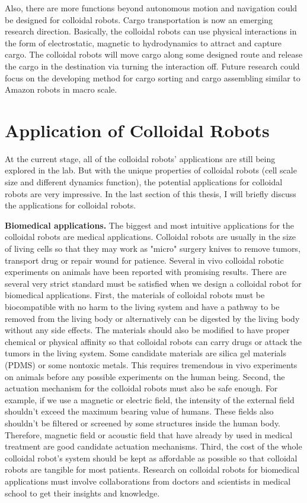 Also, there are more functions beyond autonomous motion and navigation could be designed for colloidal robots. Cargo transportation is now an emerging research direction\autocite{demirors2018active,Martinez-Pedrero2015}. Basically, the colloidal robots can use physical interactions in the form of electrostatic, magnetic to hydrodynamics to attract and capture cargo. The colloidal robots will move cargo along some designed route and release the cargo in the destination via turning the interaction off. Future research could focus  on the developing method for cargo sorting and cargo assembling similar to Amazon robots in macro scale.


\section{Application of Colloidal Robots}
At the current stage, all of the colloidal robots' applications are still being explored in the lab. But with the unique properties of colloidal robots (cell scale size and different dynamics function), the potential applications for colloidal robots are very impressive. In the last section of this thesis, I will briefly discuss the applications for colloidal robots.

\textbf{Biomedical applications.} The biggest and most intuitive applications for the colloidal robots are medical applications. Colloidal robots are usually in the size of living cells so that they may work as "micro" surgery knives to remove tumors, transport drug or repair wound for patience. Several in vivo colloidal robotic experiments  on animals have been reported with promising results\autocite{Gao2015,li2018development}. There are several very strict standard must be satisfied when we design a colloidal robot for biomedical applications. First, the materials of colloidal robots must be biocompatible with no harm to the living system and have a pathway to be removed from the living body or alternatively can be digested by the living body without any side effects. The materials should also be modified to have proper chemical or physical affinity so that colloidal robots can carry drugs or attack the tumors in the living system. Some candidate materials are silica gel materials (PDMS) or some nontoxic metals. This requires tremendous in vivo experiments on animals before  any possible experiments on the human being. Second, the actuation mechanism for the colloidal robots must also be safe enough. For example, if we use a magnetic or electric field, the intensity of the external field shouldn't exceed the maximum bearing value of humans. These fields also shouldn't be  filtered or screened by some structures inside the human body. Therefore, magnetic field or acoustic field that have already by used in medical treatment are good  candidate actuation mechanisms.  Third, the cost of the whole colloidal robot's system should be kept as affordable as possible so that colloidal robots are tangible for most patients. Research on colloidal robots for biomedical applications must involve collaborations from doctors and scientists in medical school to get their insights and knowledge.

